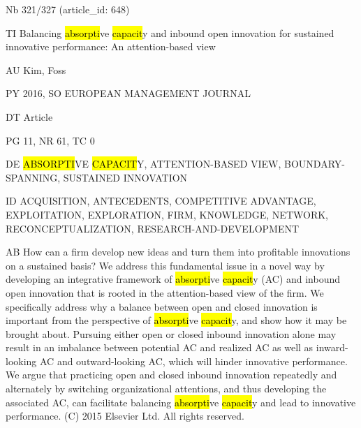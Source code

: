 \documentclass[a4paper]{article}
\begin{document}
\vspace*{-2cm}
Nb \tabto{0cm}321/327 (article\_id: 648)\par
TI \tabto{0cm}Balancing \hl{absorpti}ve \hl{capacit}y and inbound open innovation for sustained innovative performance: An attention-based view\par
AU \tabto{0cm}Kim, Foss\par
PY \tabto{0cm}2016, SO EUROPEAN MANAGEMENT JOURNAL\par
DT \tabto{0cm}Article\par
PG \tabto{0cm}11, NR 61, TC 0\par
DE \tabto{0cm}\hl{ABSORPTI}VE \hl{CAPACIT}Y, ATTENTION-BASED VIEW, BOUNDARY-SPANNING, SUSTAINED INNOVATION\par
ID \tabto{0cm}ACQUISITION, ANTECEDENTS, COMPETITIVE ADVANTAGE, EXPLOITATION, EXPLORATION, FIRM, KNOWLEDGE, NETWORK, RECONCEPTUALIZATION, RESEARCH-AND-DEVELOPMENT\par
AB \tabto{0cm}How can a firm develop new ideas and turn them into profitable innovations on a sustained basis? We address this fundamental issue in a novel way by developing an integrative framework of \hl{absorpti}ve \hl{capacit}y (AC) and inbound open innovation that is rooted in the attention-based view of the firm. We specifically address why a balance between open and closed innovation is important from the perspective of \hl{absorpti}ve \hl{capacit}y, and show how it may be brought about. Pursuing either open or closed inbound innovation alone may result in an imbalance between potential AC and realized AC as well as inward-looking AC and outward-looking AC, which will hinder innovative performance. We argue that practicing open and closed inbound innovation repeatedly and alternately by switching organizational attentions, and thus developing the associated AC, can facilitate balancing \hl{absorpti}ve \hl{capacit}y and lead to innovative performance. (C) 2015 Elsevier Ltd. All rights reserved.\par
\clearpage
\end{document}
